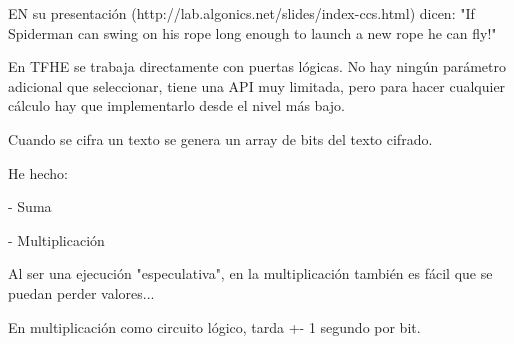 EN su presentación (http://lab.algonics.net/slides/index-ccs.html) dicen: "If Spiderman can swing on his rope long enough to launch a new rope he can fly!"

En TFHE se trabaja directamente con puertas lógicas. No hay ningún parámetro adicional que seleccionar, tiene una API muy limitada, pero para hacer cualquier cálculo hay que implementarlo desde el nivel más bajo.

Cuando se cifra un texto se genera un array de bits del texto cifrado.

He hecho:

- Suma

- Multiplicación

Al ser una ejecución "especulativa", en la multiplicación también es fácil que se puedan perder valores...

En multiplicación como circuito lógico, tarda +- 1 segundo por bit.
